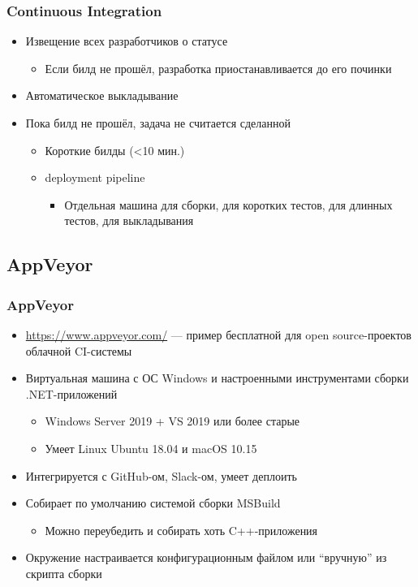 \documentclass[xetex,mathserif,serif]{beamer}
\begin{document}
	\begin{frame}
		\frametitle{Continuous Integration}
		\begin{itemize}
			\item Извещение всех разработчиков о статусе
			\begin{itemize}
				\item Если билд не прошёл, разработка приостанавливается до его починки
			\end{itemize}
			\item Автоматическое выкладывание
			\item Пока билд не прошёл, задача не считается сделанной
			\begin{itemize}
				\item Короткие билды (<10 мин.)
				\item deployment pipeline
				\begin{itemize}
					\item Отдельная машина для сборки, для коротких тестов, для длинных тестов, для выкладывания
				\end{itemize}
			\end{itemize}
		\end{itemize}
	\end{frame}

	\subsection{AppVeyor}

	\begin{frame}
		\frametitle{AppVeyor}
		\begin{itemize}
			\item \url{https://www.appveyor.com/} --- пример бесплатной для open source-проектов облачной CI-системы
			\item Виртуальная машина с ОС Windows и настроенными инструментами сборки .NET-приложений
			\begin{itemize}
				\item Windows Server 2019 + VS 2019 или более старые
				\item Умеет Linux Ubuntu 18.04 и macOS 10.15
			\end{itemize}
			\item Интегрируется с GitHub-ом, Slack-ом, умеет деплоить
			\item Собирает по умолчанию системой сборки MSBuild
			\begin{itemize}
				\item Можно переубедить и собирать хоть C++-приложения
			\end{itemize}
			\item Окружение настраивается конфигурационным файлом или ``вручную'' из скрипта сборки
		\end{itemize}
	\end{frame}
\end{document}

